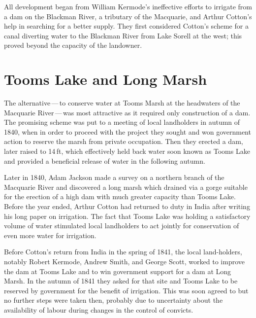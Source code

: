 All development began from William Kermode's
ineffective efforts to irrigate from a dam on the Blackman River, a
tributary of the Macquarie, and Arthur Cotton's help in searching for
a better supply.  They first considered Cotton's scheme for a canal
diverting water to the Blackman River from Lake
Sorell at the west; this proved beyond the capacity
of the landowner.

\section*{Tooms Lake and Long Marsh}

The alternative\,---\,to conserve water at Tooms Marsh at the
headwaters of the Macquarie River\,---\,was
most attractive as it required only construction of a dam.  The
promising scheme was put to a meeting of local landholders in autumn
of 1840, when in order to proceed with the project they sought and won
government action to reserve the marsh from private occupation.  Then
they erected a dam, later raised to 14\,ft, which effectively held
back water soon known as Tooms Lake and provided a beneficial release
of water in the following autumn.

Later in 1840, Adam Jackson  made a survey on a
northern branch of the Macquarie River and discovered a long marsh
which drained via a gorge suitable for the erection of a high dam with
much greater capacity than Tooms Lake.  Before the year ended, Arthur
Cotton  had returned to duty in India after writing
his long paper on irrigation.  The fact that Tooms Lake was holding a
satisfactory volume of water stimulated local landholders to act
jointly for conservation of even more water for irrigation.

Before Cotton's return from India in the spring of 1841, the local
land-holders, notably Robert Kermode,  Andrew
Smith,  and George Scott,  worked to
improve the dam at Tooms Lake
 and to win government support for a dam at Long
Marsh.  In the autumn of 1841 they asked for that site and Tooms Lake
to be reserved by government for the benefit of irrigation.  This was
soon agreed to but no further steps were taken then, probably due to
uncertainty about the availability of labour during changes in the
control of convicts.

